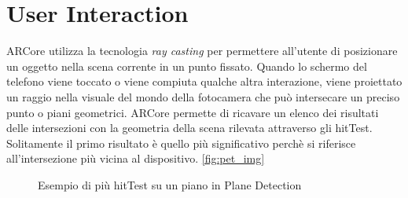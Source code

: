 \documentclass[crop=false, class=book]{standalone}
\begin{document}
	\chapter{User Interaction}
	ARCore utilizza la tecnologia \textit{ray casting} per permettere all'utente di posizionare un oggetto nella scena corrente 	in un punto fissato. Quando lo schermo del telefono viene toccato o viene compiuta qualche altra interazione, 					viene proiettato un raggio nella visuale del mondo della fotocamera che può intersecare un preciso punto o piani 				geometrici. ARCore permette di ricavare un elenco dei risultati delle intersezioni con la geometria della scena rilevata 		attraverso gli hitTest. Solitamente il primo risultato è quello più significativo perchè si riferisce all'intersezione più 		vicina al dispositivo. \vref{fig:pet_img}\\
	
	\begin{figure}
			\centering
			\caption{Esempio di più hitTest su un piano in Plane Detection}
			\label{fig:pet_img}
	\end{figure}
	
\end{document}
